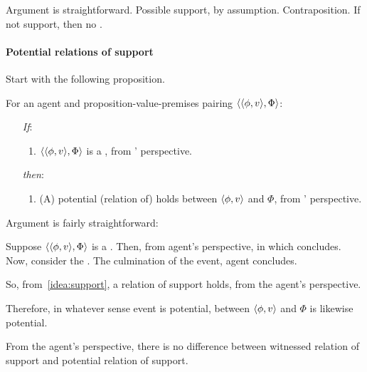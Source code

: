 \begin{note}[Argument]
  Argument is straightforward.
  Possible support, by assumption.
  Contraposition.
  If not support, then no \fc{}.
\end{note}

\paragraph{Potential relations of support}

\begin{note}
  Start with the following proposition.
  \begin{proposition}
    \label{prop:fcs-only-if-pot-support}
    For an agent \vAgent{} and proposition-value-premises pairing \(\langle \langle \phi, v \rangle, \Phi \rangle\):
    \begin{enumerate}
    \item[\emph{If}:]
      \begin{enumerate}[label=\alph*., ref=(\alph*.)]
      \item
        \(\langle \langle \phi, v \rangle, \Phi \rangle\) is a , from \vAgent{}' perspective.
      \end{enumerate}
    \item[\emph{then}:]
      \begin{enumerate}[label=\alph*., ref=(\alph*.), resume]
      \item
        (A) potential (relation of) \support{} holds between \(\langle \phi, v \rangle\) and \(\Phi\), from \vAgent{}' perspective.
      \end{enumerate}
    \end{enumerate}
    \vspace{-\baselineskip}
  \end{proposition}

  Argument is fairly straightforward:
  \begin{argument}
    Suppose \(\langle \langle \phi, v \rangle, \Phi \rangle\) is a .
    Then, from agent's perspective, \pevent{} in which concludes.
    Now, consider the \pevent{}.
    The culmination of the event, agent concludes.

    So, from~\autoref{idea:support}, a relation of support holds, from the agent's perspective.

    Therefore, in whatever sense event is potential, \support{} between \(\langle \phi, v \rangle\) and \(\Phi\) is likewise potential.
  \end{argument}
  From the agent's perspective, there is no difference between witnessed relation of support and potential relation of support.
\end{note}

